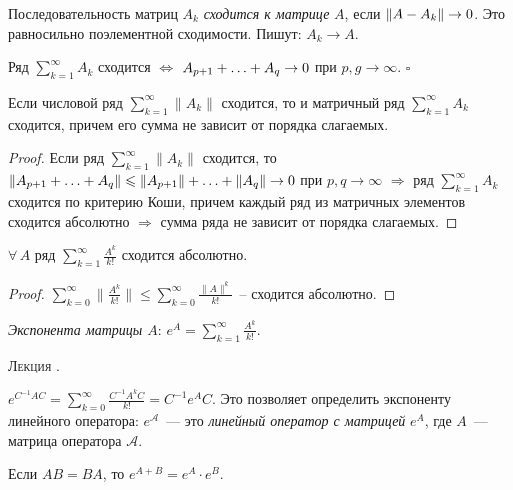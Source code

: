 \documentclass[a4paper]{article}
\newcounter{lec}
\renewcommand{\thelec}{\Roman{lec}}
\newcommand*{\lecture}[1]{\refstepcounter{lec}\vspace{20pt}
\begin{center}{\rmfamily\textsc{Лекция \thelec. \\ \textbf{#1}}}\vspace{5pt}
\end{center}}
\newcommand*{\p}[1]{#1\nobreak\discretionary{}{\hbox{$\mathsurround=0pt #1$}}{}}
\begin{document}
Последовательность матриц $A_k$ \emph{сходится к матрице} $A$, если
$\|A\p-A_k\|\to 0$. Это равносильно поэлементной сходимости. Пишут:
$A_k\to A$.

\begin{theorem}
Ряд $\sum\limits_{k=1}^\infty A_k$ сходится $\Leftrightarrow$
$A_{p+1}+\ldots\p+A_q\to 0$ при $p,g\to\infty$. $\square$
\end{theorem}

\begin{predl}
Если числовой ряд $\sum\limits_{k=1}^\infty \|A_k\|$ сходится, то и
матричный ряд $\sum\limits_{k=1}^\infty A_k$ сходится, причем его
сумма не зависит от порядка слагаемых.
\end{predl}

\begin{proof}
Если ряд $\sum\limits_{k=1}^\infty \|A_k\|$ сходится, то
$\|A_{p+1}+\ldots+A_q\|\p\leqslant\|A_{p+1}\|+\ldots+\|A_q\|\to 0$
при $p,q\to \infty$ $\Rightarrow$ ряд $\sum\limits_{k=1}^\infty A_k$
сходится по критерию Коши, причем каждый ряд из матричных элементов
сходится абсолютно $\Rightarrow$ сумма ряда не зависит от порядка
слагаемых.
\end{proof}

\begin{theorem}
$\forall \, A$ ряд $\sum\limits_{k=1}^\infty \frac{A^k}{k!}$
сходится абсолютно.
\end{theorem}

\begin{proof}
$\sum\limits_{k=0}^\infty \|\frac{A^k}{k!}\|\leqslant
\sum\limits_{k=0}^\infty \frac{\|A\|^k}{k!}$~-- сходится абсолютно.
\end{proof}

\emph{Экспонента матрицы $A$}: $e^A=\sum\limits_{k=1}^\infty
\frac{A^k}{k!}$.
\lecture{}

$e^{C^{-1}AC}=\sum\limits_{k=0}^\infty
\frac{C^{-1}A^kC}{k!}=C^{-1}e^AC$. Это позволяет определить
экспоненту линейного оператора: $e^\mathcal{A}$~--- это
\emph{линейный оператор с матрицей} $e^A$, где $A$~--- матрица
оператора $\mathcal{A}$.

\begin{lemm}
Если $AB=BA$, то $e^{A+B}=e^A\cdot e^B$.
\end{lemm}
\end{document}

